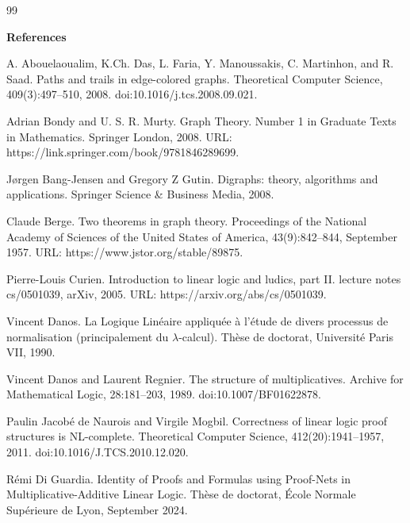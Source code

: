 \documentclass[10pt,a4paper]{amsart}
\begin{document}
\begin{thebibliography}{99}

 
\par\medskip\noindent\textbf{References}\par
  
\par\noindent  [1]  A. Abouelaoualim, K.Ch. Das, L. Faria, Y. Manoussakis, C. Martinhon, and R. Saad.  Paths and trails in edge-colored graphs.  Theoretical Computer Science, 409(3):497–510, 2008.  doi:10.1016/j.tcs.2008.09.021.  
 
\par\noindent  [2]  Adrian Bondy and U. S. R. Murty.  Graph Theory.  Number 1 in Graduate Texts in Mathematics. Springer London, 2008.  URL: https://link.springer.com/book/9781846289699.  
 
\par\noindent  [3]  Jørgen Bang-Jensen and Gregory Z Gutin.  Digraphs: theory, algorithms and applications.  Springer Science \& Business Media, 2008.  
 
\par\noindent  [4]  Claude Berge.  Two theorems in graph theory.  Proceedings of the National Academy of Sciences of the United States of America, 43(9):842–844, September 1957.  URL: https://www.jstor.org/stable/89875.  
 
\par\noindent  [5]  Pierre-Louis Curien.  Introduction to linear logic and ludics, part II.  lecture notes cs/0501039, arXiv, 2005.  URL: https://arxiv.org/abs/cs/0501039.  
 
\par\noindent  [6]  Vincent Danos.  La Logique Linéaire appliquée à l’étude de divers processus de normalisation (principalement du $\lambda$-calcul).  Thèse de doctorat, Université Paris VII, 1990.  
 
\par\noindent  [7]  Vincent Danos and Laurent Regnier.  The structure of multiplicatives.  Archive for Mathematical Logic, 28:181–203, 1989.  doi:10.1007/BF01622878.  
 
\par\noindent  [8]  Paulin Jacobé de Naurois and Virgile Mogbil.  Correctness of linear logic proof structures is NL-complete.  Theoretical Computer Science, 412(20):1941–1957, 2011.  doi:10.1016/J.TCS.2010.12.020.  
 
\par\noindent  [9]  Rémi Di Guardia.  Identity of Proofs and Formulas using Proof-Nets in Multiplicative-Additive Linear Logic.  Thèse de doctorat, École Normale Supérieure de Lyon, September 2024.  
 

\end{thebibliography}
\end{document}
